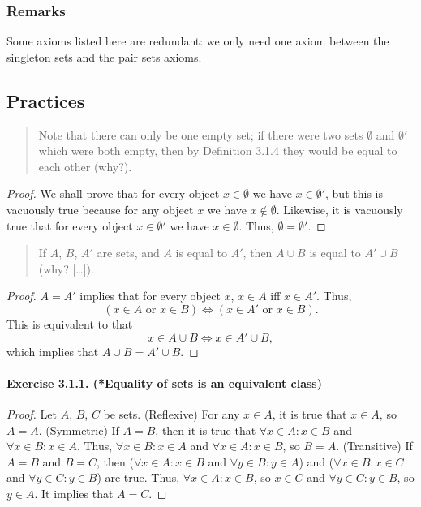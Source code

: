 \subsubsection{Remarks}
Some axioms listed here are redundant: we only need one axiom between the singleton sets and the pair sets axioms.

\subsection{Practices}
\begin{quote}
    Note that there can only be one empty set; if there were two sets $\emptyset$ and $\emptyset'$ which were both empty, then by Definition 3.1.4 they would be equal to each other (why?).
\end{quote}
\begin{proof}
    We shall prove that for every object $x \in \emptyset$ we have $x \in \emptyset'$, but this is vacuously true because for any object $x$ we have $x \notin \emptyset$. Likewise, it is vacuously true that for every object $x \in \emptyset'$ we have $x \in \emptyset$. Thus, $\emptyset = \emptyset'$.
\end{proof}

\begin{quote}
    If $A$, $B$, $A'$ are sets, and $A$ is equal to $A'$, then $A \cup B$ is equal to $A' \cup B$ (why? [\ldots]).
\end{quote}
\begin{proof}
    $A=A'$ implies that for every object $x$, $x\in A$ iff $x\in A'$. Thus, \[(x\in A \text{ or } x\in B) \iff (x\in A' \text{ or } x\in B).\] This is equivalent to that \[x\in A\cup B \iff x\in A'\cup B,\] which implies that $A\cup B = A'\cup B$.
\end{proof}

\paragraph{Exercise 3.1.1. (*Equality of sets is an equivalent class)}
\begin{proof}
    Let $A$, $B$, $C$ be sets.
    (Reflexive) For any $x \in A$, it is true that $x \in A$, so $A=A$.
    (Symmetric) If $A=B$, then it is true that $\forall x \in A : x \in B$ and $\forall x \in B : x \in A$. Thus, $\forall x \in B : x \in A$ and $\forall x \in A : x \in B$, so $B=A$.
    (Transitive) If $A=B$ and $B=C$, then ($\forall x \in A : x \in B$ and $\forall y \in B : y \in A$) and ($\forall x \in B : x \in C$ and $\forall y \in C : y \in B$) are true. Thus, $\forall x \in A : x \in B$, so $x\in C$ and $\forall y \in C : y \in B$, so $y \in A$. It implies that $A=C$.
\end{proof}

